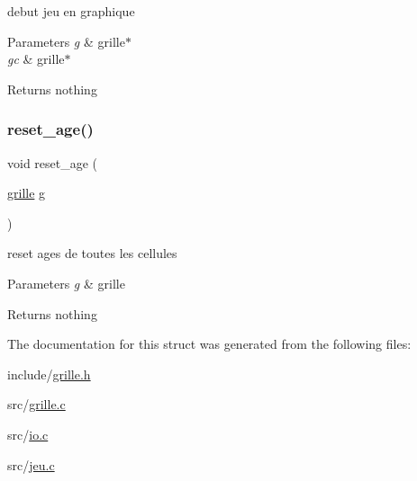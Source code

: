 debut jeu en graphique


\begin{DoxyParams}{Parameters}
{\em g} & grille$\ast$ \\
\hline
{\em gc} & grille$\ast$ \\
\hline
\end{DoxyParams}
\begin{DoxyReturn}{Returns}
nothing 
\end{DoxyReturn}
\mbox{\label{structgrille_ad6aeeb248a6f53c4eb4816fbe5c96d79}} 
\subsubsection{\texorpdfstring{reset\+\_\+age()}{reset\_age()}}
{\footnotesize\ttfamily void reset\+\_\+age (\begin{DoxyParamCaption}\item[{\hyperlink{structgrille}{grille}}]{g }\end{DoxyParamCaption})\hspace{0.3cm}{\ttfamily [related]}}

reset ages de toutes les cellules


\begin{DoxyParams}{Parameters}
{\em g} & grille \\
\hline
\end{DoxyParams}
\begin{DoxyReturn}{Returns}
nothing 
\end{DoxyReturn}


The documentation for this struct was generated from the following files\+:\begin{DoxyCompactItemize}
\item 
include/\hyperlink{grille_8h}{grille.\+h}\item 
src/\hyperlink{grille_8c}{grille.\+c}\item 
src/\hyperlink{io_8c}{io.\+c}\item 
src/\hyperlink{jeu_8c}{jeu.\+c}\end{DoxyCompactItemize}
